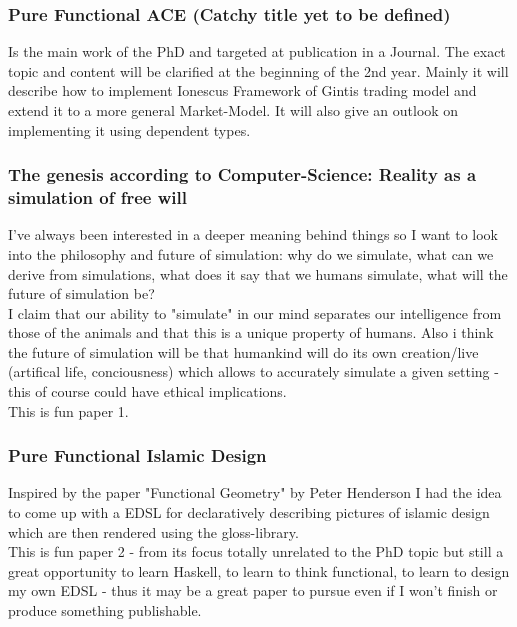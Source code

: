 \subsubsection{Pure Functional ACE (Catchy title yet to be defined)}
Is the main work of the PhD and targeted at publication in a Journal. The exact topic and content will be clarified at the beginning of the 2nd year. Mainly it will describe how to implement Ionescus Framework of Gintis trading model and extend it to a more general Market-Model. It will also give an outlook on implementing it using dependent types.

\subsubsection{The genesis according to Computer-Science: Reality as a simulation of free will}
I've always been interested in a deeper meaning behind things so I want to look into the philosophy and future of simulation: why do we simulate, what can we derive from simulations, what does it say that we humans simulate, what will the future of simulation be? \\
I claim that our ability to "simulate" in our mind separates our intelligence from those of the animals and that this is a unique property of humans. Also i think the future of simulation will be that humankind will do its own creation/live (artifical life, conciousness) which allows to accurately simulate a given setting - this of course could have ethical implications. \\
This is fun paper 1.

\subsubsection{Pure Functional Islamic Design}
Inspired by the paper "Functional Geometry" by Peter Henderson I had the idea to come up with a  EDSL for declaratively describing pictures of islamic design which are then rendered using the gloss-library. \\
This is fun paper 2 - from its focus totally unrelated to the PhD topic but still a great opportunity to learn Haskell, to learn to think functional, to learn to design my own EDSL - thus it may be a great paper to pursue even if I won't finish or produce something publishable.